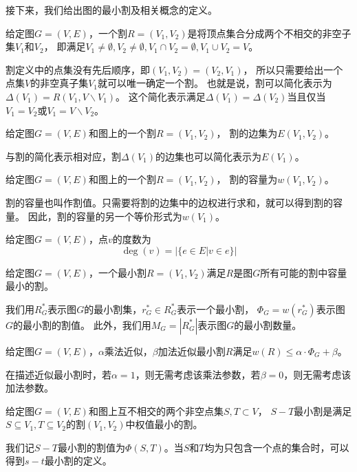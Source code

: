 接下来，我们给出图的最小割及相关概念的定义。
\begin{definition}
   给定图$G=(V,E)$，一个割$R=(V_1,V_2)$是将顶点集合分成两个不相交的非空子集$V_1$和$V_2$，
   即满足$V_1\neq \emptyset,V_2\neq \emptyset,V_1\cap V_2=\emptyset,V_1\cup V_2=V$。
\end{definition}
割定义中的点集没有先后顺序，即$(V_1,V_2)=(V_2,V_1)$，
所以只需要给出一个点集$V$的非空真子集$V_1$就可以唯一确定一个割。
也就是说，割可以简化表示为$\Delta(V_1)=R(V_1,V\backslash V_1)$。
这个简化表示满足$\Delta(V_1)=\Delta(V_2)$当且仅当$V_1=V_2$或$V_1=V\backslash V_2$。
    \begin{definition}
    给定图$G=(V,E)$和图上的一个割$R=(V_1,V_2)$，
    割的边集为$E(V_1,V_2)$。
\end{definition}
与割的简化表示相对应，割$\Delta(V_1)$的边集也可以简化表示为$E(V_1)$。
\begin{definition}
    给定图$G=(V,E)$和图上的一个割$R=(V_1,V_2)$，
    割的容量为$ w(V_1,V_2)$。
\end{definition}
割的容量也叫作割值。只需要将割的边集中的边权进行求和，就可以得到割的容量。
因此，割的容量的另一个等价形式为$w(V_1)$。
\begin{definition}[点的度数]
    给定图$G=(V,E)$，点$v$的度数为
    \begin{equation*}
        \deg(v)=|\{e\in E|v\in e\}|
    \end{equation*}
\end{definition}
\begin{definition}
    给定图$G=(V,E)$，一个最小割$R=(V_1,V_2)$满足$R$是图$G$所有可能的割中容量最小的割。
\end{definition}
    我们用$R^*_{G}$表示图$G$的最小割集，$r^*_{G}\in R^*_{G}$表示一个最小割，
    $\Phi_G=w(r^*_{G})$表示图$G$的最小割的割值。
    此外，我们用$M_G=|R^*_{G}|$表示图$G$的最小割数量。
\begin{definition}
    给定图$G=(V,E)$，$\alpha$乘法近似，$\beta$加法近似最小割$R$满足$w(R)\leq \alpha ·\Phi_G+\beta$。
\end{definition}
在描述近似最小割时，若$\alpha=1$，则无需考虑该乘法参数，若$\beta=0$，则无需考虑该加法参数。
\begin{definition}[$S-T$最小割]
    给定图$G=(V,E)$和图上互不相交的两个非空点集$S,T\subset V$，
    $S-T$最小割是满足$S\subseteq V_1,T\subseteq V_2$的割$(V_1,V_2)$中权值最小的割。
\end{definition}
我们记$S-T$最小割的割值为$\Phi(S,T)$。当$S$和$T$均为只包含一个点的集合时，可以得到$s-t$最小割的定义。

